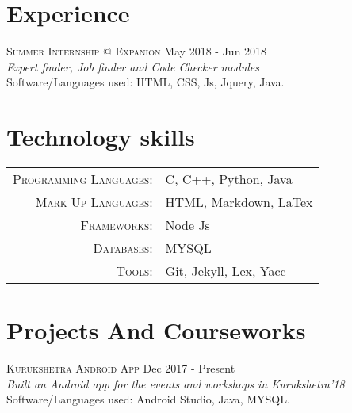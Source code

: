 \documentclass[a4paper,10pt]{article}
\begin{document}
\section{Experience}
{\textsc{Summer Internship @ Expanion} \hfill May 2018 - Jun 2018 \\
\emph{Expert finder, Job finder and Code Checker modules}\\
Software/Languages used: HTML, CSS, Js, Jquery, Java.} \\

\section{Technology skills}
\begin{tabular}{rl}
 \textsc{Programming Languages:}& C, C++, Python, Java\\
\textsc{Mark Up Languages:}& HTML, Markdown, LaTex\\
\textsc{Frameworks:}& Node Js\\
\textsc{Databases:}& MYSQL\\
\textsc{Tools:}& Git, Jekyll, Lex, Yacc\\
\end{tabular}

\section{Projects And Courseworks}
{\textsc{ Kurukshetra Android App} \hfill Dec 2017 - Present \\
\emph{Built an Android app for the events and workshops in Kurukshetra'18}\\
Software/Languages used: Android Studio, Java, MYSQL.} \\
\end{document}
